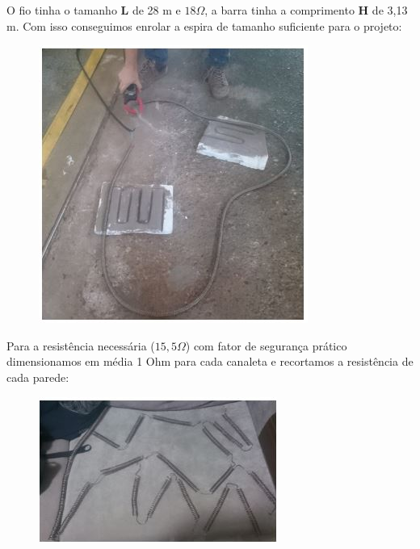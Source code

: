 O fio tinha o tamanho \textbf{L} de 28 m e $18\Omega$, a barra tinha a comprimento \textbf{H} de 3,13 m. Com isso conseguimos enrolar a espira de tamanho suficiente para o projeto:
\begin{figure}[H]
	\centering
	\label{foto2}
	\includegraphics[keepaspectratio=true,scale=0.8]{figuras/alimentacao7.JPG}
\end{figure}

Para a resistência necessária ($15,5 \Omega$) com fator de segurança prático dimensionamos em média 1 Ohm para cada canaleta e recortamos a resistência de cada parede:
\begin{figure}[H]
	\centering
	\label{foto3}
	\includegraphics[keepaspectratio=true,scale=0.8]{figuras/alimentacao8.JPG}
\end{figure}

